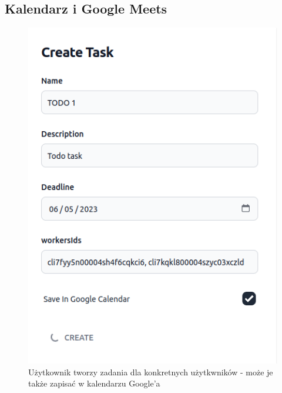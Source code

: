 \documentclass[a4paper, 12pt]{article}
\begin{document}
\subsection{Kalendarz i Google Meets}
\begin{figure}[H]
	\centering
    \includegraphics*[scale=0.8]{img/create-task.png}
	\caption{Użytkownik tworzy zadania dla konkretnych użytkwników - może je także zapisać w kalendarzu Google'a}
\end{figure}
\end{document}
